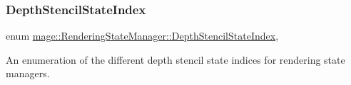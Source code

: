 \hypertarget{classmage_1_1_rendering_state_manager_abcfd0e984d2ba2710320882430d6871a}{}\label{classmage_1_1_rendering_state_manager_abcfd0e984d2ba2710320882430d6871a} 
\subsubsection{\texorpdfstring{Depth\+Stencil\+State\+Index}{DepthStencilStateIndex}}
{\footnotesize\ttfamily enum \hyperlink{classmage_1_1_rendering_state_manager_abcfd0e984d2ba2710320882430d6871a}{mage\+::\+Rendering\+State\+Manager\+::\+Depth\+Stencil\+State\+Index}\hspace{0.3cm}{\ttfamily [strong]}, {\ttfamily [private]}}

An enumeration of the different depth stencil state indices for rendering state managers.

